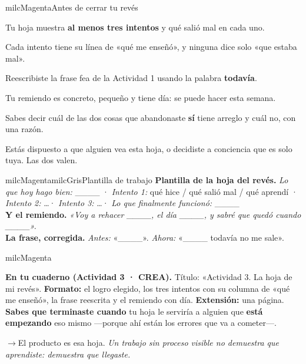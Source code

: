 \documentclass[11pt,letterpaper]{article}
\newcommand{\puente}[1]{%
  \begin{puentebox}%
    \textcolor{milcGradeDark}{$\rightarrow$}\hspace{2mm}#1%
  \end{puentebox}%
}
\begin{document}
\begin{drawbox}{milcMagenta}{Antes de cerrar tu revés}
\begin{checklista}
\item Tu hoja muestra \textbf{al menos tres intentos} y qué salió mal en cada uno.
\item Cada intento tiene su línea de «qué me enseñó», y ninguna dice solo «que estaba mal».
\item Reescribiste la frase fea de la Actividad 1 usando la palabra \textbf{todavía}.
\item Tu remiendo es concreto, pequeño y tiene día: se puede hacer esta semana.
\item Sabes decir cuál de las dos cosas que abandonaste \textbf{sí} tiene arreglo y cuál no, con una razón.
\item Estás dispuesto a que alguien vea esta hoja, o decidiste a conciencia que es solo tuya. Las dos valen.
\end{checklista}
\end{drawbox}

\begin{softbox}{milcMagenta}{milcGris}{Plantilla de trabajo}
\textbf{Plantilla de la hoja del revés.} \emph{Lo que hoy hago bien:} \_\_\_\_ · \emph{Intento 1:} qué hice / qué salió mal / qué aprendí · \emph{Intento 2:} \ldots · \emph{Intento 3:} \ldots · \emph{Lo que finalmente funcionó:} \_\_\_\_ \\[1mm]
\textbf{Y el remiendo.} \emph{«Voy a rehacer \_\_\_\_, el día \_\_\_\_, y sabré que quedó cuando \_\_\_\_».} \\[1mm]
\textbf{La frase, corregida.} \emph{Antes:} «\_\_\_\_». \emph{Ahora:} «\_\_\_\_ todavía no me sale».
\end{softbox}

\begin{infoband}{milcMagenta}


\textbf{En tu cuaderno (Actividad 3 · CREA).} Título: «Actividad 3. La hoja de mi revés». \textbf{Formato:} el logro elegido, los tres intentos con su columna de «qué me enseñó», la frase reescrita y el remiendo con día. \textbf{Extensión:} una página. \textbf{Sabes que terminaste cuando} tu hoja le serviría a alguien que \textbf{está empezando} eso mismo ---porque ahí están los errores que va a cometer---.
\end{infoband}

\puente{El producto es esa hoja. \emph{Un trabajo sin proceso visible no demuestra que aprendiste: demuestra que llegaste.}}
\end{document}
